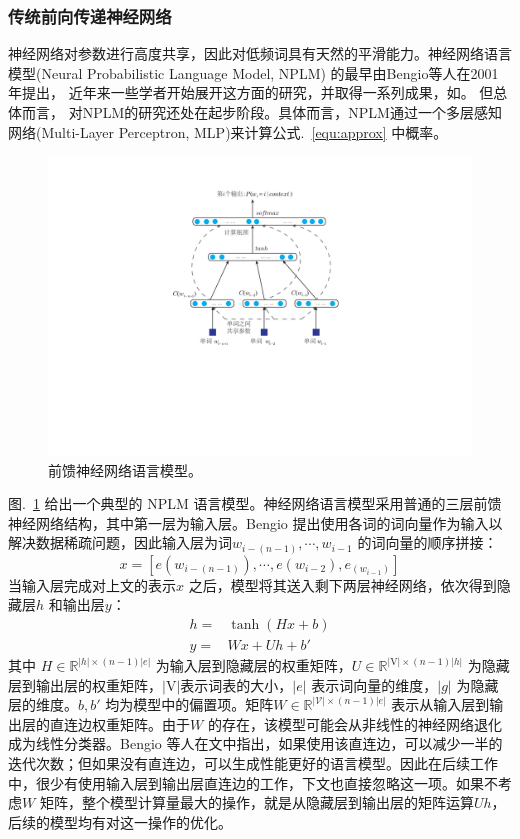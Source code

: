 \documentclass[twoside,UTF8,AutoFakeBold]{buaathesis}
\begin{document}
\subsubsection{传统前向传递神经网络}
神经网络对参数进行高度共享，因此对低频词具有天然的平滑能力。神经网络语言模型(Neural Probabilistic Language Model, NPLM) 的最早由Bengio等人在2001年提出\cite{DBLP:conf/nips/BengioDV00}， 近年来一些学者开始展开这方面的研究，并取得一系列成果，如\cite{DBLP:conf/acl/BaroniDK14,DBLP:journals/sigkdd/BellK07,DBLP:journals/pami/BengioCV13,DBLP:journals/tnn/BengioSF94}。 但总体而言， 对NPLM的研究还处在起步阶段。具体而言，NPLM通过一个多层感知网络(Multi-Layer Perceptron, MLP)来计算公式.~\ref{equ:approx} 中概率。
\begin{figure}
  \centering
  \includegraphics[width=0.68\linewidth]{./figures/nplm.pdf}
  \caption{前馈神经网络语言模型。}\label{fig:nplm}
\end{figure}

图.~\ref{fig:nplm} 给出一个典型的 NPLM 语言模型。神经网络语言模型采用普通的三层前馈神经网络结构，其中第一层为输入层。Bengio 提出使用各词的词向量作为输入以解决数据稀疏问题，因此输入层为词$w_{i-(n-1)}, \cdots,w_{i-1} $ 的词向量的顺序拼接：
\begin{equation}\label{equ:we}
  x = [e(w_{i-(n-1)}), \cdots , e(w_{i-2}), e_{(w_{i-1})}]
\end{equation}
当输入层完成对上文的表示$x$ 之后，模型将其送入剩下两层神经网络，依次得到隐藏层$h$ 和输出层$y$：
\begin{equation}\label{equ:all_nplm}
\begin{split}
h =& \tanh(Hx+b) \\
y =&Wx + Uh +b'
\end{split}
\end{equation}
其中 $H \in \mathbb{R}^{|h| \times (n-1)|e|}$ 为输入层到隐藏层的权重矩阵，$U \in \mathbb{R}^{|\mathrm{V}|\times (n-1)|h|}$ 为隐藏层到输出层的权重矩阵，$ |\mathrm{V}|$表示词表的大小，$|e|$ 表示词向量的维度，$|g|$ 为隐藏层的维度。$b,b'$ 均为模型中的偏置项。矩阵$W \in \mathbb{R}^{|\mathcal{V}|\times (n-1)|e|}$ 表示从输入层到输出层的直连边权重矩阵。由于$W$ 的存在，该模型可能会从非线性的神经网络退化成为线性分类器。Bengio 等人在文中指出，如果使用该直连边，可以减少一半的迭代次数；但如果没有直连边，可以生成性能更好的语言模型。因此在后续工作中，很少有使用输入层到输出层直连边的工作，下文也直接忽略这一项。如果不考虑$W$ 矩阵，整个模型计算量最大的操作，就是从隐藏层到输出层的矩阵运算$Uh$，后续的模型均有对这一操作的优化。
\end{document}
